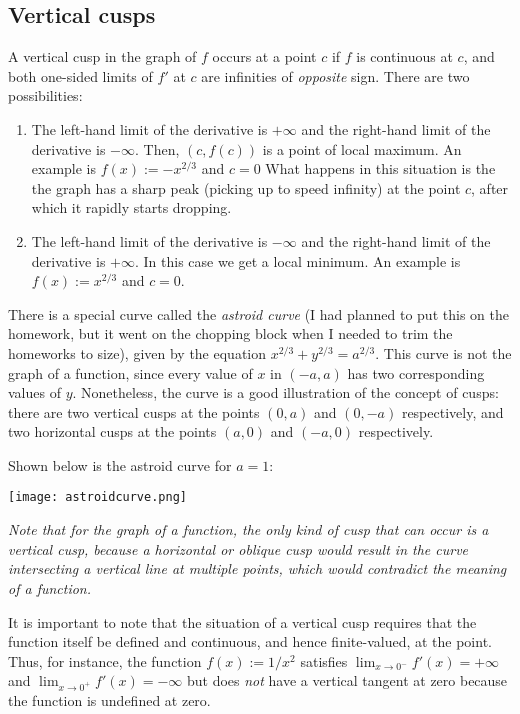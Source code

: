 \documentclass[10pt]{amsart}
\begin{document}
\subsection{Vertical cusps}

A vertical cusp in the graph of $f$ occurs at a point $c$ if $f$ is
continuous at $c$, and both one-sided limits of $f'$ at $c$ are
infinities of {\em opposite} sign. There are two possibilities:

\begin{enumerate}
\item The left-hand limit of the derivative is $+\infty$ and the
  right-hand limit of the derivative is $-\infty$. Then, $(c,f(c))$ is
  a point of local maximum. An example is $f(x) := -x^{2/3}$ and $c =
  0$ What happens in this situation is the the graph has a sharp peak
  (picking up to speed infinity) at the point $c$, after which it
  rapidly starts dropping.
\item The left-hand limit of the derivative is $-\infty$ and the
  right-hand limit of the derivative is $+\infty$. In this case we get
  a local minimum. An example is $f(x) := x^{2/3}$ and $c = 0$.
\end{enumerate}

There is a special curve called the {\em astroid curve} (I had planned
to put this on the homework, but it went on the chopping block when I
needed to trim the homeworks to size), given by the equation $x^{2/3}
+ y^{2/3} = a^{2/3}$. This curve is not the graph of a function, since
every value of $x$ in $(-a,a)$ has two corresponding values of
$y$. Nonetheless, the curve is a good illustration of the concept of
cusps: there are two vertical cusps at the points $(0,a)$ and $(0,-a)$
respectively, and two horizontal cusps at the points $(a,0)$ and
$(-a,0)$ respectively.

Shown below is the astroid curve for $a = 1$:

\texttt{[image: astroidcurve.png]}

{\em Note that for the graph of a function, the only kind of cusp that
can occur is a vertical cusp, because a horizontal or oblique cusp
would result in the curve intersecting a vertical line at multiple
points, which would contradict the meaning of a function.}

It is important to note that the situation of a vertical cusp requires
that the function itself be defined and continuous, and hence
finite-valued, at the point. Thus, for instance, the function $f(x) :=
1/x^2$ satisfies $\lim_{x \to 0^-} f'(x) = +\infty$ and $\lim_{x \to
0^+} f'(x) = -\infty$ but does {\em not} have a vertical tangent at
zero because the function is undefined at zero.
\end{document}
